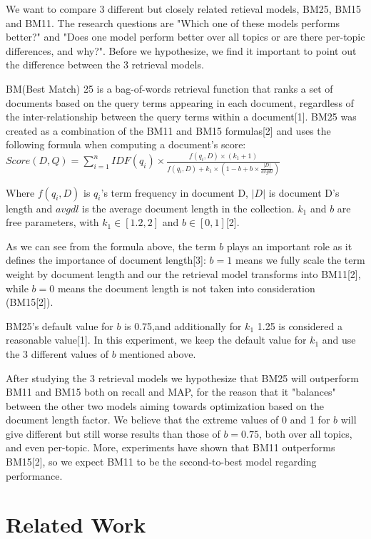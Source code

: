 \documentclass[letterpaper,11pt]{article}
\begin{document}
We want to compare 3 different but closely related retieval models, BM25, BM15 and BM11. The research questions are "Which one of these models performs better?" and "Does one model perform better over all topics or are there per-topic differences, and why?". Before we hypothesize, we find it important to point out the difference between the 3 retrieval models.

BM(Best Match) 25 is a bag-of-words retrieval function that ranks a set of documents based on the query terms appearing in each document, regardless of the inter-relationship between the query terms within a document[1]. BM25 was created as a combination of the BM11 and BM15 formulas[2] and uses the following formula when computing a document's score:  
\newpage
$Score(D,Q) = \sum^n_{i=1}{IDF(q_i)} \times 	\frac{f(q_i,D) \times (k_1 +1)}{f(q_i,D) + k_1 \times (1-b+b\times \frac{|D|}{avgdl})}$

Where  $f(q_i,D)$ is $q_i$'s term frequency in document D, $|D|$ is document D's length and $avgdl$ is the average document length in the collection. $k_1$ and $b$ are free parameters, with $k_1 \in [1.2,2]$ and $b \in [0,1]$[2]. 



As we can see from the formula above, the term $b$ plays an important role as it defines the importance of document length[3]: $b=1$ means we fully scale the term weight by document length and our the retrieval model transforms into BM11[2], while $b=0$ means the document length is not taken into consideration (BM15[2]).

BM25's default value for $b$ is 0.75,and additionally for $k_1$ 1.25 is considered a reasonable value[1]. In this experiment, we keep the default value for $k_1$ and use the 3 different values of $b$ mentioned above.

After studying the 3 retrieval models we hypothesize that BM25 will outperform BM11 and BM15 both on recall and MAP, for the reason that it "balances" between the other two models aiming towards optimization based on the document length factor. We believe that the extreme values of 0 and 1 for $b$ will give different but still worse results than those of $b=0.75$, both over all topics, and even per-topic. More, experiments have shown that BM11 outperforms BM15[2], so we expect BM11 to be the second-to-best model regarding performance.




\section{Related Work}
\end{document}
